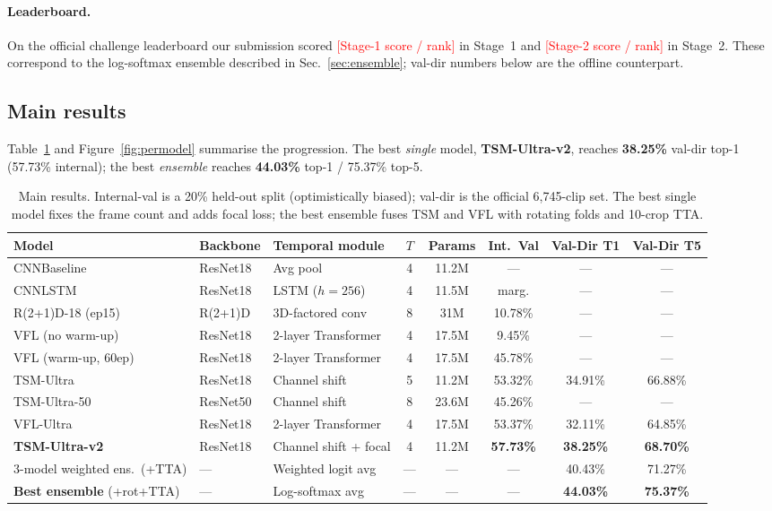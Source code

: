 \documentclass[10pt,twocolumn,letterpaper]{article}
\newcommand{\LBONE}{\textcolor{red}{[Stage-1 score / rank]}}  %
\newcommand{\LBTWO}{\textcolor{red}{[Stage-2 score / rank]}}  %
\begin{document}
\paragraph{Leaderboard.}
On the official challenge leaderboard our submission scored \LBONE{} in Stage~1
and \LBTWO{} in Stage~2. These correspond to the log-softmax ensemble described
in Sec.~\ref{sec:ensemble}; val-dir numbers below are the offline counterpart.

\subsection{Main results}
Table~\ref{tab:main} and Figure~\ref{fig:permodel} summarise the progression.
The best \emph{single} model, \textbf{TSM-Ultra-v2}, reaches \textbf{38.25\%}
val-dir top-1 (57.73\% internal); the best \emph{ensemble} reaches
\textbf{44.03\%} top-1 / 75.37\% top-5.

\begin{table}[t]
\centering\small
\setlength{\tabcolsep}{5pt}
\begin{tabular}{@{}lllccccc@{}}
\toprule
Model & Backbone & Temporal module & $T$ & Params & Int.\ Val & Val-Dir T1 & Val-Dir T5 \\
\midrule
CNNBaseline             & ResNet18 & Avg pool            & 4 & 11.2M & ---     & ---     & --- \\
CNNLSTM                 & ResNet18 & LSTM ($h{=}256$)    & 4 & 11.5M & marg.   & ---     & --- \\
R(2+1)D-18 (ep15)       & R(2+1)D  & 3D-factored conv    & 8 & 31M   & 10.78\% & ---     & --- \\
VFL (no warm-up)        & ResNet18 & 2-layer Transformer & 4 & 17.5M & \phantom{0}9.45\% & --- & --- \\
VFL (warm-up, 60ep)     & ResNet18 & 2-layer Transformer & 4 & 17.5M & 45.78\% & ---     & --- \\
TSM-Ultra               & ResNet18 & Channel shift       & 5 & 11.2M & 53.32\% & 34.91\% & 66.88\% \\
TSM-Ultra-50            & ResNet50 & Channel shift       & 8 & 23.6M & 45.26\% & ---     & --- \\
VFL-Ultra               & ResNet18 & 2-layer Transformer & 4 & 17.5M & 53.37\% & 32.11\% & 64.85\% \\
\textbf{TSM-Ultra-v2}   & ResNet18 & Channel shift + focal & 4 & 11.2M & \textbf{57.73\%} & \textbf{38.25\%} & \textbf{68.70\%} \\
\midrule
3-model weighted ens.\ (+TTA)  & --- & Weighted logit avg & --- & --- & --- & 40.43\% & 71.27\% \\
\textbf{Best ensemble} (+rot+TTA) & --- & Log-softmax avg & --- & --- & --- & \textbf{44.03\%} & \textbf{75.37\%} \\
\bottomrule
\end{tabular}
\caption{Main results. Internal-val is a 20\% held-out split (optimistically
biased); val-dir is the official 6{,}745-clip set. The best single model fixes
the frame count and adds focal loss; the best ensemble fuses TSM and VFL with
rotating folds and 10-crop TTA.}
\label{tab:main}
\end{table}
\end{document}

